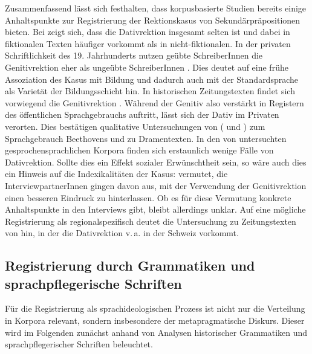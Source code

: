 Zusammenfassend lässt sich festhalten, dass korpusbasierte Studien bereits einige Anhaltspunkte zur Registrierung der Rektionskasus von Sekundärpräpositionen bieten. 
Bei \citet[]{DiMeola2000} zeigt sich, dass die Dativrektion insgesamt selten ist und dabei in fiktionalen Texten häufiger vorkommt als in nicht-fiktionalen. 
In der privaten Schriftlichkeit des 19. Jahrhunderts nutzen geübte SchreiberInnen die Genitivrektion eher als ungeübte SchreiberInnen \citep[s.][]{Elspa.2005}. 
Dies deutet auf eine frühe Assoziation des Kasus mit Bildung und dadurch auch mit der Standardsprache als Varietät der Bildungsschicht hin. 
In historischen Zeitungstexten findet sich vorwiegend die Genitivrektion \citep[s.][]{Elspa.2015}. 
Während der Genitiv also verstärkt in Registern des öffentlichen Sprachgebrauchs auftritt, lässt sich der Dativ im Privaten verorten. 
Dies bestätigen qualitative Untersuchungen von \citeauthor{Sato.2015} (\citeyear{Sato.2015} und \citeyear{Sato.2016}) zum Sprachgebrauch Beethovens und zu Dramentexten. 
In den von \citet{Petig1997} untersuchten gesprochensprachlichen Korpora finden sich erstaunlich wenige Fälle von Dativrektion.
Sollte dies ein Effekt sozialer Erwünschtheit sein, so wäre auch dies ein Hinweis auf die Indexikalitäten der Kasus: 
\citet[37]{Petig1997} vermutet, die InterviewpartnerInnen gingen davon aus, mit der Verwendung der Genitivrektion einen besseren Eindruck zu hinterlassen.
Ob es für diese Vermutung konkrete Anhaltspunkte in den Interviews gibt, bleibt allerdings unklar. 
Auf eine mögliche Registrierung als regionalspezifisch deutet die Untersuchung zu Zeitungstexten von \citet{Elter2005} hin, in der die Dativrektion v.\,a. in der Schweiz vorkommt. 
\subsection{Registrierung durch Grammatiken und sprachpflegerische Schriften} \label{sec:IndexikalitaetRektionskasushistorisch}
Für die Registrierung als sprachideologischen Prozess ist nicht nur die Verteilung in Korpora relevant, sondern insbesondere der metapragmatische Diskurs. 
Dieser wird im Folgenden zunächst anhand von Analysen historischer Grammatiken und sprachpflegerischer Schriften beleuchtet. 

